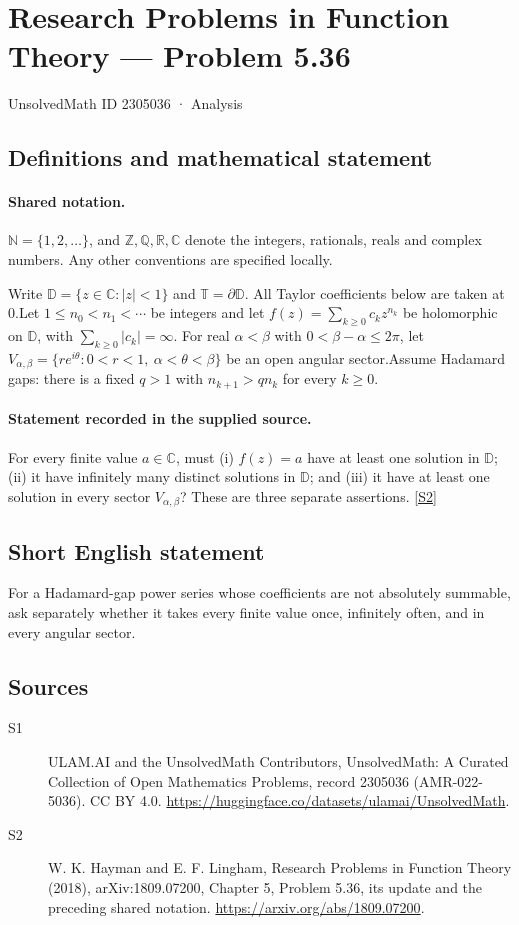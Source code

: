 \documentclass[11pt]{article}
\newcommand{\sref}[2]{\hyperlink{source:#1:#2}{[S#2]}}
\begin{document}
\setcounter{section}{2305035}
\section{Research Problems in Function Theory — Problem 5.36}\label{2305036}
{\small\sffamily UnsolvedMath ID 2305036 · Analysis}
\subsection{Definitions and mathematical statement}

\paragraph{Shared notation.}$\mathbb N=\{1,2,\ldots\}$, and $\mathbb Z,\mathbb Q,\mathbb R,\mathbb C$ denote the integers, rationals, reals and complex numbers. Any other conventions are specified locally.


Write $\mathbb D=\{z\in\mathbb C:|z|<1\}$ and $\mathbb T=\partial\mathbb D$. All Taylor coefficients below are taken at $0$.Let $1\le n_0<n_1<\cdots$ be integers and let $f(z)=\sum_{k\ge0}c_kz^{n_k}$ be holomorphic on $\mathbb D$, with $\sum_{k\ge0}|c_k|=\infty$. For real $\alpha<\beta$ with $0<\beta-\alpha\le2\pi$, let $V_{\alpha,\beta}=\{re^{i\theta}:0<r<1,\ \alpha<\theta<\beta\}$ be an open angular sector.Assume Hadamard gaps: there is a fixed $q>1$ with $n_{k+1}>q n_k$ for every $k\ge0$.
\paragraph{Statement recorded in the supplied source.}
For every finite value $a\in\mathbb C$, must (i) $f(z)=a$ have at least one solution in $\mathbb D$; (ii) it have infinitely many distinct solutions in $\mathbb D$; and (iii) it have at least one solution in every sector $V_{\alpha,\beta}$? These are three separate assertions. \sref{2305036}{2}
\subsection{Short English statement}
For a Hadamard-gap power series whose coefficients are not absolutely summable, ask separately whether it takes every finite value once, infinitely often, and in every angular sector.
\subsection{Sources}
\begin{description}
\item[\hypertarget{source:2305036:1}{S1}] ULAM.AI and the UnsolvedMath Contributors, UnsolvedMath: A Curated Collection of Open Mathematics Problems, record 2305036 (AMR-022-5036). CC BY 4.0. \url{https://huggingface.co/datasets/ulamai/UnsolvedMath}.
\item[\hypertarget{source:2305036:2}{S2}] W. K. Hayman and E. F. Lingham, Research Problems in Function Theory (2018), arXiv:1809.07200, Chapter 5, Problem 5.36, its update and the preceding shared notation. \url{https://arxiv.org/abs/1809.07200}.
\end{description}
\label{end:2305036}
\end{document}
